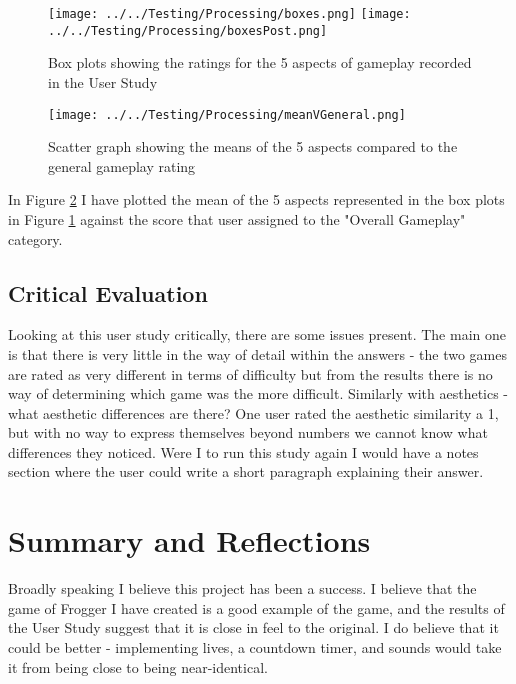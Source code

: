 \documentclass[12pt, a4paper]{report}
\begin{document}
\begin{figure}[ht]
  \centering
  \caption{Box plots showing the ratings for the 5 aspects of gameplay recorded in the User Study}
  \texttt{[image: ../../Testing/Processing/boxes.png]}
  \texttt{[image: ../../Testing/Processing/boxesPost.png]}
  \label{fig:boxes}
\end{figure}

\begin{figure}[ht]
  \centering
  \caption{Scatter graph showing the means of the 5 aspects compared to the general gameplay rating}
  \texttt{[image: ../../Testing/Processing/meanVGeneral.png]}
  \label{fig:meanVGeneral}
\end{figure}

In Figure \ref{fig:meanVGeneral} I have plotted the mean of the 5 aspects represented in the box plots in Figure \ref{fig:boxes} against the score that user assigned to the "Overall Gameplay" category.

\subsection{Critical Evaluation}

Looking at this user study critically, there are some issues present.
The main one is that there is very little in the way of detail within the answers - the two games are rated as very different in terms of difficulty but from the results there is no way of determining which game was the more difficult.
Similarly with aesthetics - what aesthetic differences are there?
One user rated the aesthetic similarity a 1, but with no way to express themselves beyond numbers we cannot know what differences they noticed.
Were I to run this study again I would have a notes section where the user could write a short paragraph explaining their answer.

\section{Summary and Reflections}

Broadly speaking I believe this project has been a success.
I believe that the game of Frogger I have created is a good example of the game, and the results of the User Study suggest that it is close in feel to the original.
I do believe that it could be better - implementing lives, a countdown timer, and sounds would take it from being close to being near-identical.
\end{document}
